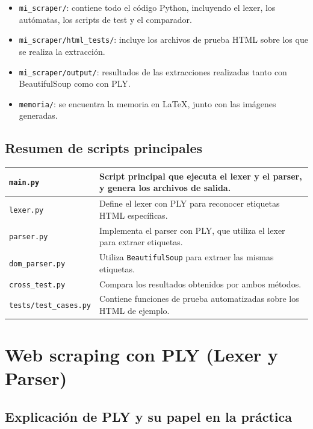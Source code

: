 \documentclass[11pt,a4paper]{article}
\begin{document}
\begin{itemize}
    \item \texttt{mi\_scraper/}: contiene todo el código Python, incluyendo el lexer, los autómatas, los scripts de test y el comparador.
    \item \texttt{mi\_scraper/html\_tests/}: incluye los archivos de prueba HTML sobre los que se realiza la extracción.
    \item \texttt{mi\_scraper/output/}: resultados de las extracciones realizadas tanto con BeautifulSoup como con PLY.
    \item \texttt{memoria/}: se encuentra la memoria en \LaTeX, junto con las imágenes generadas.
\end{itemize}

\subsection{Resumen de scripts principales}

\begin{table}[h]
\centering
\renewcommand{\arraystretch}{1.2}
\small
\begin{tabular}{|l|p{11cm}|}
\hline
\texttt{main.py} & Script principal que ejecuta el lexer y el parser, y genera los archivos de salida. \\ \hline
\texttt{lexer.py} & Define el lexer con PLY para reconocer etiquetas HTML específicas. \\ \hline
\texttt{parser.py} & Implementa el parser con PLY, que utiliza el lexer para extraer etiquetas. \\ \hline
\texttt{dom\_parser.py} & Utiliza \texttt{BeautifulSoup} para extraer las mismas etiquetas. \\ \hline
\texttt{cross\_test.py} & Compara los resultados obtenidos por ambos métodos. \\ \hline
\texttt{tests/test\_cases.py} & Contiene funciones de prueba automatizadas sobre los HTML de ejemplo. \\ \hline
\end{tabular}
\normalsize 
\end{table}

\section{Web scraping con PLY (Lexer y Parser)}
\subsection{Explicación de PLY y su papel en la práctica}
\end{document}
